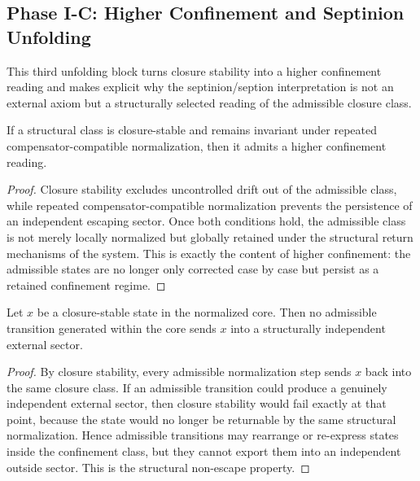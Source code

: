 \subsection*{Phase I-C: Higher Confinement and Septinion Unfolding}

This third unfolding block turns closure stability into a higher confinement
reading and makes explicit why the septinion/seption interpretation is not an
external axiom but a structurally selected reading of the admissible closure
class.

\begin{lemma}
\label{lem:higher-confinement-lemma}
If a structural class is closure-stable and remains invariant under repeated
compensator-compatible normalization, then it admits a higher confinement
reading.
\end{lemma}

\begin{proof}
Closure stability excludes uncontrolled drift out of the admissible class, while
repeated compensator-compatible normalization prevents the persistence of an
independent escaping sector. Once both conditions hold, the admissible class is
not merely locally normalized but globally retained under the structural return
mechanisms of the system. This is exactly the content of higher confinement:
the admissible states are no longer only corrected case by case but persist as a
retained confinement regime.
\end{proof}

\begin{lemma}
\label{lem:non-escape-lemma}
Let $x$ be a closure-stable state in the normalized core. Then no admissible
transition generated within the core sends $x$ into a structurally independent
external sector.
\end{lemma}

\begin{proof}
By closure stability, every admissible normalization step sends $x$ back into
the same closure class. If an admissible transition could produce a genuinely
independent external sector, then closure stability would fail exactly at that
point, because the state would no longer be returnable by the same structural
normalization. Hence admissible transitions may rearrange or re-express states
inside the confinement class, but they cannot export them into an independent
outside sector. This is the structural non-escape property.
\end{proof}


